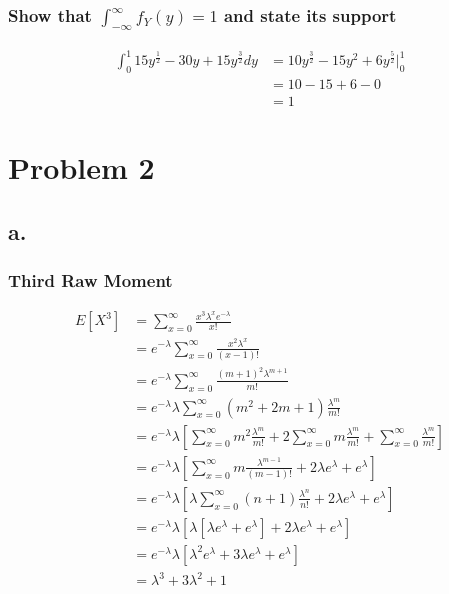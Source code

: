 \documentclass[12pt]{article}
\begin{document}
\subsubsection*{Show that $\int_{-\infty}^\infty f_Y(y) = 1$ and state its support}
\begin{align*}
  \int_0^1 15y^{\frac{1}{2}}-30y+15y^{\frac{3}{2}}dy
  &= 10y^{\frac{3}{2}}-15y^2+6y^{\frac{5}{2}}\big|_0^1 \\
  &= 10-15+6-0 \\
  &= 1
\end{align*}

\section*{Problem 2}

\subsection*{a.}

\subsubsection*{Third Raw Moment}
\begin{align*}
  E[X^3] &= \sum_{x=0}^\infty \frac{x^3\lambda^x e^{-\lambda}}{x!} \\
  &= e^{-\lambda} \sum_{x=0}^{\infty} \frac{x^2\lambda^x}{(x-1)!} \\
  &= e^{-\lambda} \sum_{x=0}^{\infty} \frac{(m+1)^2\lambda^{m+1}}{m!} \\
  &= e^{-\lambda}\lambda \sum_{x=0}^{\infty} (m^2+2m+1)\frac{\lambda^m}{m!} \\
  &= e^{-\lambda}\lambda \left[\sum_{x=0}^{\infty} m^2\frac{\lambda^m}{m!}
    + 2\sum_{x=0}^{\infty} m\frac{\lambda^m}{m!}
    + \sum_{x=0}^{\infty} \frac{\lambda^m}{m!}\right] \\
  &= e^{-\lambda}\lambda \left[\sum_{x=0}^{\infty} m\frac{\lambda^{m-1}}{(m-1)!}
    + 2\lambda e^{\lambda}
    + e^{\lambda}\right] \\
  &= e^{-\lambda}\lambda \left[\lambda\sum_{x=0}^{\infty} (n+1)\frac{\lambda^{n}}{n!}
    + 2\lambda e^{\lambda}
    + e^{\lambda}\right] \\
  &= e^{-\lambda}\lambda \left[\lambda\left[ \lambda e^{\lambda} + e^{\lambda} \right]
    + 2\lambda e^{\lambda}
    + e^{\lambda}\right] \\
  &= e^{-\lambda}\lambda \left[\lambda^2 e^{\lambda} + 3\lambda e^{\lambda} + e^{\lambda} \right] \\
  &= \lambda^3 + 3\lambda^2 + 1
\end{align*}
\end{document}
